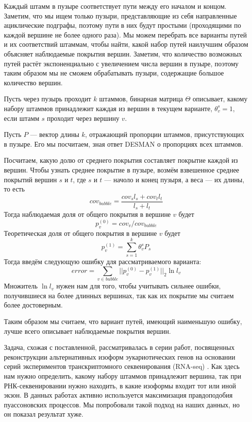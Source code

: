 \documentclass{spbau-diploma}
\begin{document}
Каждый штамм в пузыре соответствует пути между его началом и концом. Заметим, что мы ищем только пузыри, представляющие из себя направленные ациклические подграфы, поэтому пути в них будут простыми (проходящими по каждой вершине не более одного раза). Мы можем перебрать все варианты путей и их соответствий штаммам, чтобы найти, какой набор путей наилучшим образом объясняет наблюдаемые покрытия вершин. Заметим, что количество возможных путей растёт экспоненциально с увеличением числа вершин в пузыре, поэтому таким образом мы не сможем обрабатывать пузыри, содержащие большое количество вершин.

Пусть через пузырь проходит $k$ штаммов, бинарная матрица $\Theta$ описывает, какому набору штаммов принадлежит каждая из вершин в текущем варианте, $\theta_{v}^{s} = 1$, если штамм $s$ проходит через вершину $v$. 

Пусть $P$ --- вектор длины $k$, отражающий пропорции штаммов, присутствующих в пузыре. Его мы посчитаем, зная ответ DESMAN о пропорциях всех штаммов.

Посчитаем, какую долю от среднего покрытия составляет покрытие каждой из вершин. Чтобы узнать среднее покрытие в пузыре, возмём взвешенное среднее покрытий вершин $s$ и $t$, где $s$ и $t$ --- начоло и конец пузыря, а веса --- их длины, то есть $$cov_{bubble} = \frac{cov_s l_s + cov_t l_t}{l_s + l_t}$$
Тогда наблюдаемая доля от общего покрытия в вершине $v$ будет $$p_{v}^{(0)} = cov_{v} / cov_{bubble}$$
Теоретическая доля от общего покрытия в вершине $v$ будет $$p_{v}^{(1)} = \sum_{s=1}^{k} \theta_{v}^{s} P_s$$
Тогда введём следующую ошибку для рассматриваемого варианта:
$$error = \sum_{v \in bubble} ||p_{v}^{(0)} - p_{v}^{(1)}||_2 \ln l_{v}$$
Множитель $\ln l_v$ нужен нам для того, чтобы учитывать сильнее ошибки, получившиеся на более длинных вершинах, так как их покрытие мы считаем более достоверным.

Таким образом мы считаем, что вариант путей, имеющий наименьшую ошибку, лучше всего описывает наблюдаемые покрытия вершин.

Задача, схожая с поставленной, рассматривалась в серии работ, посвященных реконструкции альтернативных изоформ эукариотических генов на основании серий экспериментов транскриптомного секвенирования (RNA-seq) \cite{flipflop2, other_flows, flipflop1}. Как здесь нам нужно определить, какому набору штаммов принадлежит вершина, так при РНК-секвенировании нужно находить, в какие изоформы входит тот или иной экзон. В данных работах активно используется максимизация правдоподобия пуассоновских процессов. Мы попробовали такой подход на наших данных, но он показал результат хуже.
\end{document}
